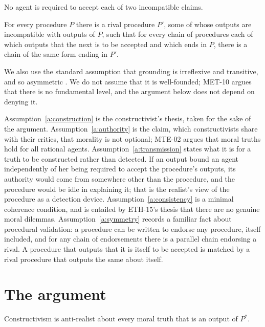 \documentclass{situationist-preprint}
\begin{document}
\begin{assumption}\label{a:consistency}
No agent is required to accept each of two incompatible claims.
\end{assumption}

\begin{assumption}\label{a:symmetry}
For every procedure $P$ there is a rival procedure $P'$, some of whose outputs are incompatible with outputs of $P$, such that for every chain of procedures each of which outputs that the next is to be accepted and which ends in $P$, there is a chain of the same form ending in $P'$.
\end{assumption}

We also use the standard assumption that grounding is irreflexive and transitive, and so asymmetric \citep{Fine2012,Rosen2010}. We do not assume that it is well-founded; MET-10 argues that there is no fundamental level, and the argument below does not depend on denying it.

Assumption~\ref{a:construction} is the constructivist's thesis, taken for the sake of the argument. Assumption~\ref{a:authority} is the claim, which constructivists share with their critics, that morality is not optional; MTE-02 argues that moral truths hold for all rational agents. Assumption~\ref{a:transmission} states what it is for a truth to be constructed rather than detected. If an output bound an agent independently of her being required to accept the procedure's outputs, its authority would come from somewhere other than the procedure, and the procedure would be idle in explaining it; that is the realist's view of the procedure as a detection device. Assumption~\ref{a:consistency} is a minimal coherence condition, and is entailed by ETH-15's thesis that there are no genuine moral dilemmas. Assumption~\ref{a:symmetry} records a familiar fact about procedural validation: a procedure can be written to endorse any procedure, itself included, and for any chain of endorsements there is a parallel chain endorsing a rival. A procedure that outputs that it is itself to be accepted is matched by a rival procedure that outputs the same about itself.

\section{The argument}\label{s:argument}

\begin{lemma}\label{l:outcome}
Constructivism is anti-realist about every moral truth that is an output of $P^*$.
\end{lemma}
\end{document}
